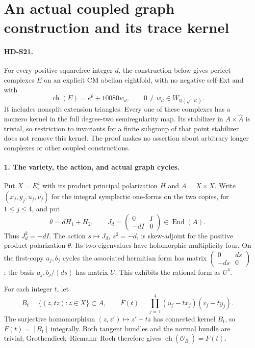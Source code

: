 \section{An actual coupled graph construction and its trace kernel}

\paragraph{HD-S21.}
For every positive squarefree integer $d$, the construction below gives
perfect complexes $E$ on an explicit CM abelian eightfold, with no
negative self-Ext and with
\[
 \operatorname{ch}(E)=e^\theta+10080w_d,
 \qquad 0\ne w_d\in W_{\mathbb Q(\sqrt{-d})}.
\]
It includes nonsplit extension triangles. Every one of these complexes
has a nonzero kernel in the full degree-two semiregularity map.
Its stabilizer in $A\times\widehat A$ is trivial, so restriction to
invariants for a finite subgroup of that point stabilizer does not
remove this kernel. The proof makes no assertion about arbitrary
longer complexes or other coupled constructions.

\paragraph{1. The variety, the action, and actual graph cycles.}
Put $X=E_i^4$ with its product principal polarization $H$ and
$A=X\times X$. Write $(x_j,y_j,u_j,v_j)$ for the integral symplectic
one-forms on the two copies, for $1\le j\le4$, and put
\[
 \theta=dH_1+H_2,\qquad
 J_d=\begin{pmatrix}0&I\\-dI&0\end{pmatrix}\in\operatorname{End}(A).
\]
Thus $J_d^2=-dI$. The action $s\mapsto J_d$, $s^2=-d$, is
skew-adjoint for the positive product polarization $\theta$.
Its two eigenvalues have holomorphic multiplicity four.
On the first-copy $a_j,b_j$ cycles the associated hermitian form has
matrix $\left(\begin{smallmatrix}0&ds\\-ds&0\end{smallmatrix}\right)$;
the basis $a_j,b_j/(ds)$ has matrix $U$. This exhibits the rational
form as $U^4$.

For each integer $t$, let
\[
 B_t=\{(z,tz):z\in X\}\subset A,\qquad
 F(t)=\prod_{j=1}^4(u_j-tx_j)(v_j-ty_j).
\]
The surjective homomorphism $(z,z')\mapsto z'-tz$ has connected
kernel $B_t$, so $F(t)=[B_t]$ integrally. Both tangent bundles and
the normal bundle are trivial; Grothendieck--Riemann--Roch therefore
gives $\operatorname{ch}(\mathcal O_{B_t})=F(t)$.

